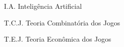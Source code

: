 \begin{siglas}

	\item[I.A.] Inteligência Artificial
	\item[T.C.J.] Teoria Combinatória dos Jogos
	\item[T.E.J.] Teoria Econômica dos Jogos

\end{siglas}
